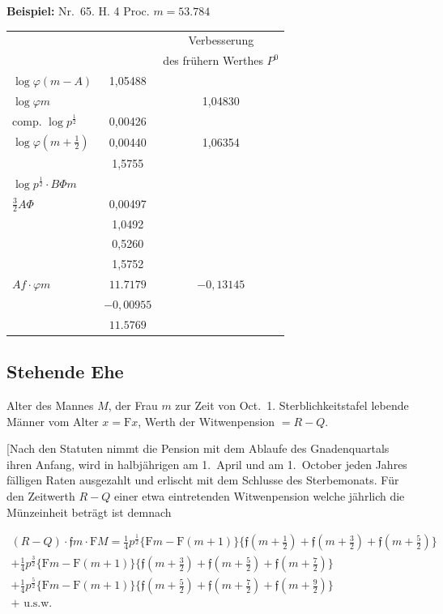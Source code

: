 \documentclass[12pt,a4paper]{article}
\begin{document}
\textbf{Beispiel:} Nr.~65. H. 4 Proc. $m = 53.784$

\begin{center}
\begin{tabular}{l|c|c}
 & & Verbesserung \\
 & & des frühern Werthes $P^0$ \\
\hline
$\log \varphi(m-A)$ & 1,05488 & \\
$\log \varphi m$ & & 1,04830 \\
comp. $\log p^{\frac{1}{2}}$ & 0,00426 & \\
$\log \varphi(m+\tfrac{1}{2})$ & 0,00440 & 1,06354 \\
 & 1,5755 & \\
$\log p^{\frac{1}{2}} \cdot B\Phi m$ & & \\
$\tfrac{3}{2}A\Phi$ & 0,00497 & \\
 & 1,0492 & \\
 & 0,5260 & \\
 & 1,5752 & \\
\hline
$A f \cdot \varphi m$ & $11.7179$ & $-0,13145$ \\
 & $-0,00955$ & \\
 & $11.5769$ & \\
\end{tabular}
\end{center}

\subsection*{Stehende Ehe}

Alter des Mannes $M$, der Frau $m$ zur Zeit von Oct.~1. Sterblichkeitstafel lebende Männer vom Alter $x = \mathrm{F}x$, Werth der Witwenpension $= R - Q$.

[Nach den Statuten nimmt die Pension mit dem Ablaufe des Gnadenquartals ihren Anfang, wird in halbjährigen am 1.~April und am 1.~October jeden Jahres fälligen Raten ausgezahlt und erlischt mit dem Schlusse des Sterbemonats. Für den Zeitwerth $R-Q$ einer etwa eintretenden Witwenpension welche jährlich die Münzeinheit beträgt ist demnach

\begin{multline}
(R-Q) \cdot \mathfrak{f}m \cdot \mathrm{F}M = \tfrac{1}{4}p^{\frac{1}{2}} \{\mathrm{F}m - \mathrm{F}(m+1)\}\{\mathfrak{f}(m+\tfrac{1}{2}) + \mathfrak{f}(m+\tfrac{3}{2}) + \mathfrak{f}(m+\tfrac{5}{2})\} \\
+ \tfrac{1}{4}p^{\frac{3}{2}} \{\mathrm{F}m - \mathrm{F}(m+1)\}\{\mathfrak{f}(m+\tfrac{3}{2}) + \mathfrak{f}(m+\tfrac{5}{2}) + \mathfrak{f}(m+\tfrac{7}{2})\} \\
+ \tfrac{1}{4}p^{\frac{5}{2}} \{\mathrm{F}m - \mathrm{F}(m+1)\}\{\mathfrak{f}(m+\tfrac{5}{2}) + \mathfrak{f}(m+\tfrac{7}{2}) + \mathfrak{f}(m+\tfrac{9}{2})\} \\
+ \text{ u.s.w.}
\end{multline}
\end{document}
